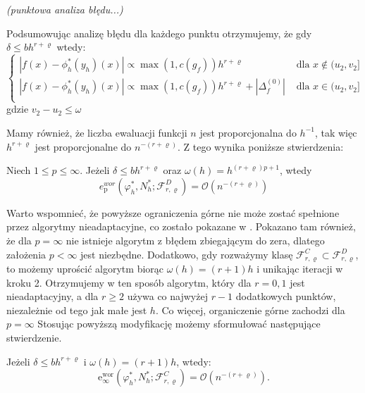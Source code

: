 \documentclass[oik, pdftex, robocza, man]{mgrwms}
\begin{document}
    \textit{(punktowa analiza błędu...)}

    Podsumowując analizę błędu dla każdego punktu otrzymujemy, że gdy $\delta \leq bh^{r+\varrho}$ wtedy:
    \begin{equation*}
        \begin{cases}
            |f(x) - \phi_{h}^{*}(y_{h})(x)| \propto \max(1, c(g_{f})) h^{r+\varrho} & \text{ dla } x \notin (u_{2}, v_{2}] \\
            |f(x) - \phi_{h}^{*}(y_{h})(x)| \propto \max(1, c(g_{f})) h^{r+\varrho} + |\Delta_{f}^{(0)}| & \text{ dla } x \in (u_{2}, v_{2}] \\
        \end{cases}
    \end{equation*}
    gdzie $v_{2} - u_{2} \leq \omega$

    Mamy również, że liczba ewaluacji funkcji $n$ jest proporcjonalna do $h^{-1}$, tak więc $h^{r+\varrho}$ jest proporcjonalne do $n^{-(r+\varrho)}$. Z tego wynika poniższe stwierdzenia:
    \begin{stw}
        \label{stw2}
        Niech $1 \leq p \leq \infty$. Jeżeli $\delta \leq bh^{r+\varrho}$ oraz $\omega(h) = h^{(r+\varrho)p + 1}$, wtedy
        \begin{equation*}
            e_{\mathrm{p}}^{wor}\left(\varphi_{h}^{*}, N_{h}^{*} ; \mathcal{F}_{r, \varrho}^{D}\right)=\mathcal{O}\left(n^{-(r+\varrho)}\right)
        \end{equation*}
    \end{stw}

    Warto wspomnieć, że powyższe ograniczenia górne nie może zostać spełnione przez algorytmy nieadaptacyjne, co zostało pokazane w \cite{PoA}. Pokazano tam również, że dla $p=\infty$ nie istnieje algorytm z błędem zbiegającym do zera, dlatego założenia $p < \infty$ jest niezbędne. Dodatkowo, gdy rozważymy klasę $\mathcal{F}_{r, \varrho}^{C} \subset \mathcal{F}_{r, \varrho}^{D}$, to możemy uprościć algorytm biorąc $\omega(h) = (r+1)h$ i unikając iteracji w kroku 2. Otrzymujemy w ten sposób algorytm, który dla $r=0,1$ jest nieadaptacyjny, a dla $r \geq 2$ używa co najwyżej $r-1$ dodatkowych punktów, niezależnie od tego jak małe jest $h$. Co więcej, organiczenie górne zachodzi dla $p = \infty$
    Stosując powyższą modyfikację możemy sformułować następujące stwierdzenie.

    \begin{stw}
        \label{stw3}
        Jeżeli $\delta \leq bh^{r+\varrho}$ i $\omega(h) = (r+1)h$, wtedy:
        \begin{equation}
            \mathrm{e}_{\infty}^{\mathrm{wor}}\left(\varphi_{h}^{*}, N_{h}^{*} ; \mathcal{F}_{r, \varrho}^{C}\right)=\mathcal{O}\left(n^{-(r+\varrho)}\right) .
        \end{equation}
    \end{stw}
\end{document}
